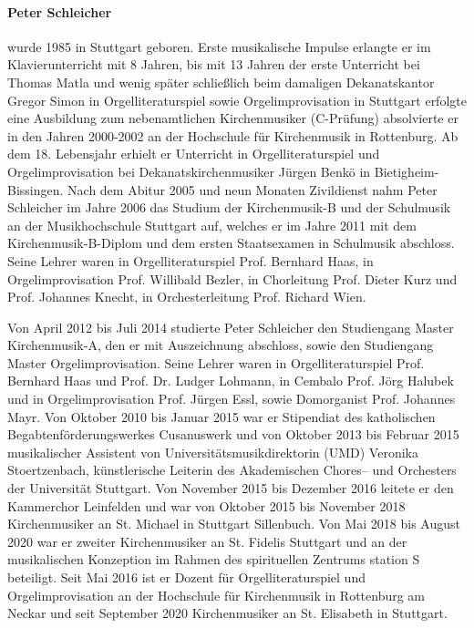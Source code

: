 \documentclass[a5paper,twoside,fontsize=10pt]{scrartcl}
\begin{document}
\paragraph{Peter Schleicher} wurde 1985 in Stuttgart geboren.
Erste musikalische Impulse erlangte er im Klavierunterricht mit 8 Jahren, bis mit 13 Jahren der erste Unterricht bei Thomas Matla und wenig später schließlich beim damaligen Dekanatskantor Gregor Simon in Orgelliteraturspiel sowie Orgelimprovisation in Stuttgart erfolgte eine Ausbildung zum nebenamtlichen Kirchenmusiker (C-Prüfung) absolvierte er in den Jahren 2000-2002 an der Hochschule für Kirchenmusik in Rottenburg.
Ab dem 18. Lebensjahr erhielt er Unterricht in Orgelliteraturspiel und Orgelimprovisation bei Dekanatskirchenmusiker Jürgen Benkö in Bietigheim-Bissingen.
Nach dem Abitur 2005 und neun Monaten Zivildienst nahm Peter Schleicher im Jahre 2006 das Studium der Kirchenmusik-B und der Schulmusik an der Musikhochschule Stuttgart auf, welches er im Jahre 2011 mit dem Kirchenmusik-B-Diplom und dem ersten Staatsexamen in Schulmusik abschloss.
Seine Lehrer waren in Orgelliteraturspiel Prof. Bernhard Haas, in Orgelimprovisation Prof. Willibald Bezler, in Chorleitung Prof. Dieter Kurz und Prof. Johannes Knecht, in Orchesterleitung Prof. Richard Wien.

Von April 2012 bis Juli 2014 studierte Peter Schleicher den Studiengang Master Kirchenmusik-A, den er mit Auszeichnung abschloss, sowie den Studiengang Master Orgelimprovisation.
Seine Lehrer waren in Orgelliteraturspiel Prof. Bernhard Haas und Prof. Dr. Ludger Lohmann, in Cembalo Prof. Jörg Halubek und in Orgelimprovisation Prof. Jürgen Essl, sowie Domorganist Prof. Johannes Mayr.
Von Oktober 2010 bis Januar 2015 war er Stipendiat des katholischen Begabtenförderungswerkes Cusanuswerk und von Oktober 2013 bis Februar 2015 musikalischer Assistent von Universitätsmusikdirektorin (UMD) Veronika Stoertzenbach, künstlerische Leiterin des Akademischen Chores– und Orchesters der Universität Stuttgart.
Von November 2015 bis Dezember 2016 leitete er den Kammerchor Leinfelden und war von Oktober 2015 bis November 2018 Kirchenmusiker an St. Michael in Stuttgart Sillenbuch.
Von Mai 2018 bis August 2020 war er zweiter Kirchenmusiker an St. Fidelis Stuttgart und an der musikalischen Konzeption im Rahmen des spirituellen Zentrums station S beteiligt.
Seit Mai 2016 ist er Dozent für Orgelliteraturspiel und Orgelimprovisation an der Hochschule für Kirchenmusik in Rottenburg am Neckar und seit September 2020 Kirchenmusiker an St. Elisabeth in Stuttgart.
\end{document}
